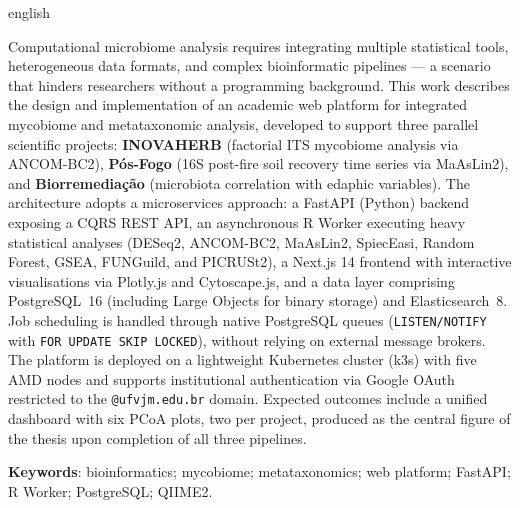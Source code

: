 \begin{resumo}[Abstract]
\begin{otherlanguage*}{english}

Computational microbiome analysis requires integrating multiple
statistical tools, heterogeneous data formats, and complex
bioinformatic pipelines --- a scenario that hinders researchers
without a programming background. This work describes the design and
implementation of an academic web platform for integrated mycobiome
and metataxonomic analysis, developed to support three parallel
scientific projects: \textbf{INOVAHERB} (factorial ITS mycobiome
analysis via ANCOM-BC2), \textbf{Pós-Fogo} (16S post-fire soil
recovery time series via MaAsLin2), and \textbf{Biorremediação}
(microbiota correlation with edaphic variables). The architecture
adopts a microservices approach: a FastAPI (Python) backend exposing
a CQRS REST API, an asynchronous R Worker executing heavy statistical
analyses (DESeq2, ANCOM-BC2, MaAsLin2, SpiecEasi, Random Forest,
GSEA, FUNGuild, and PICRUSt2), a Next.js 14 frontend with interactive
visualisations via Plotly.js and Cytoscape.js, and a data layer
comprising PostgreSQL~16 (including Large Objects for binary storage) and Elasticsearch~8. Job scheduling
is handled through native PostgreSQL queues (\texttt{LISTEN/NOTIFY}
with \texttt{FOR UPDATE SKIP LOCKED}), without relying on external
message brokers. The platform is deployed on a lightweight Kubernetes
cluster (k3s) with five AMD nodes and supports institutional
authentication via Google OAuth restricted to the
\texttt{@ufvjm.edu.br} domain. Expected outcomes include a unified
dashboard with six PCoA plots, two per project, produced as the
central figure of the thesis upon completion of all three pipelines.

\vspace{\onelineskip}
\noindent
\textbf{Keywords}: bioinformatics; mycobiome; metataxonomics; web platform; FastAPI; R Worker; PostgreSQL; QIIME2.

\end{otherlanguage*}
\end{resumo}
